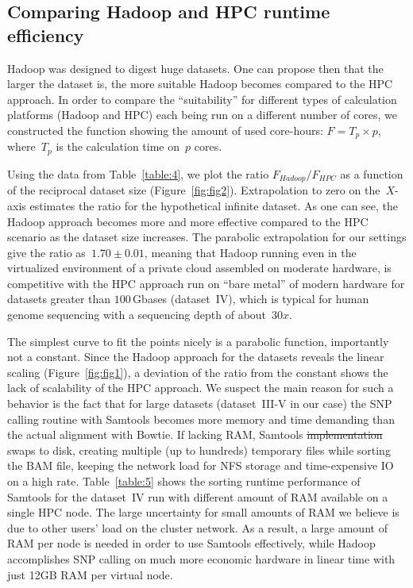 \documentclass[10pt]{article}
\newcommand{\COMMENT}[1]{{\color{red} #1 }}
\begin{document}
\subsection*{Comparing Hadoop and HPC runtime efficiency}
Hadoop was designed to digest huge datasets\cite{hadoop,lin2010}. One can propose then that the larger the dataset is, the more suitable Hadoop becomes compared to the HPC approach. In order to compare the ``suitability'' for different types of calculation platforms (Hadoop and HPC) each being run on a different number of cores, we constructed the function showing the amount of used core-hours:
$F=T_{p}\times p,$ 
where~$T_{p}$ is the calculation time on~$p$ cores. 

Using the data from Table~\ref{table:4}, we plot the ratio $F_{Hadoop}/F_{HPC}$ as a function of the reciprocal dataset size (Figure~\ref{fig:fig2}). Extrapolation to zero on the~$X$-axis estimates the ratio for the hypothetical infinite dataset. As one can see, the Hadoop approach becomes more and more effective compared to the HPC scenario as the dataset size increases. 
The parabolic extrapolation for our settings give the ratio as~$1.70\pm0.01$, meaning that Hadoop running even in the virtualized environment of a private cloud assembled on moderate hardware, is competitive with the HPC approach run on ``bare metal'' of modern hardware for datasets greater than $100$\,Gbases (dataset~IV), which is typical for human genome sequencing with a sequencing depth of about~$30x$.


The simplest curve to fit the points nicely is a parabolic function, importantly not a constant. 
Since the Hadoop approach for the datasets reveals the linear scaling (Figure~\ref{fig:fig1}), a deviation of the ratio from the constant shows the 
lack of scalability of the HPC approach.
We suspect the main reason for such a behavior is the fact that for large datasets (dataset~III-V in our case) the SNP calling routine with Samtools becomes more memory and time demanding than the actual alignment with Bowtie.
If lacking RAM, Samtools \sout{implementation} swaps to disk, creating multiple (up to hundreds) temporary files while sorting the BAM file, keeping the network load for NFS storage and time-expensive IO on a high rate.
Table~\ref{table:5} shows the sorting runtime performance of Samtools for the dataset~IV run with different amount of RAM available on a single HPC node. The large uncertainty for small amounts of RAM we believe is due to other users' load on the cluster network. As a result, a large amount of RAM per node is needed in order to use Samtools effectively, while Hadoop accomplishes SNP calling on much more economic hardware in linear time with just 12GB RAM per virtual node.
\end{document}
